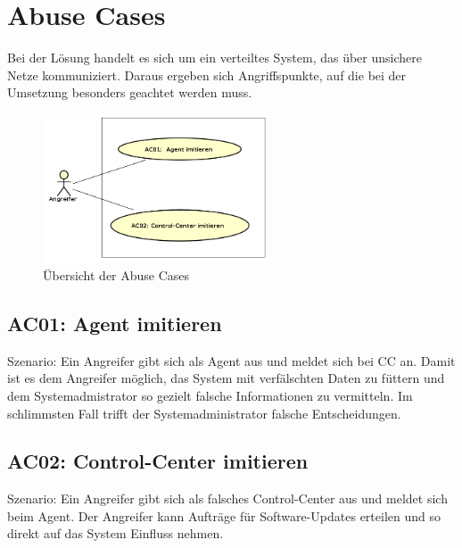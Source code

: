 \section{Abuse Cases}

Bei der Lösung handelt es sich um ein verteiltes System, das über unsichere Netze kommuniziert. Daraus ergeben sich Angriffspunkte, auf die bei der Umsetzung besonders geachtet werden muss.

\begin{figure}
  \centering
    \includegraphics[width=0.6\textwidth]{files/AbuseCases_small}
  \caption{Übersicht der Abuse Cases}
  \label{fig:abusecases}
\end{figure}

\subsection*{AC01: Agent imitieren}
\label{auc:01}

Szenario: Ein Angreifer gibt sich als Agent aus und meldet sich bei CC an. Damit ist es dem Angreifer möglich, das System mit verfälschten Daten zu füttern und dem Systemadmistrator so gezielt falsche Informationen zu vermitteln. Im schlimmsten Fall trifft der Systemadministrator falsche Entscheidungen.

\subsection*{AC02: Control-Center imitieren}
\label{auc:02}

Szenario: Ein Angreifer gibt sich als falsches Control-Center aus und meldet sich beim Agent. Der Angreifer kann Aufträge für Software-Updates erteilen und so direkt auf das System Einfluss nehmen.